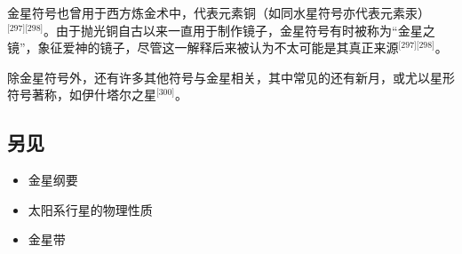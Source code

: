 金星符号也曾用于西方炼金术中，代表元素铜（如同水星符号亦代表元素汞）\(^\text{[297][298]}\)。由于抛光铜自古以来一直用于制作镜子，金星符号有时被称为“金星之镜”，象征爱神的镜子，尽管这一解释后来被认为不太可能是其真正来源\(^\text{[297][298]}\)。

除金星符号外，还有许多其他符号与金星相关，其中常见的还有新月，或尤以星形符号著称，如伊什塔尔之星\(^\text{[300]}\)。
\subsection{另见}
\begin{itemize}
\item 金星纲要  
\item 太阳系行星的物理性质  
\item 金星带 
\end{itemize} 
